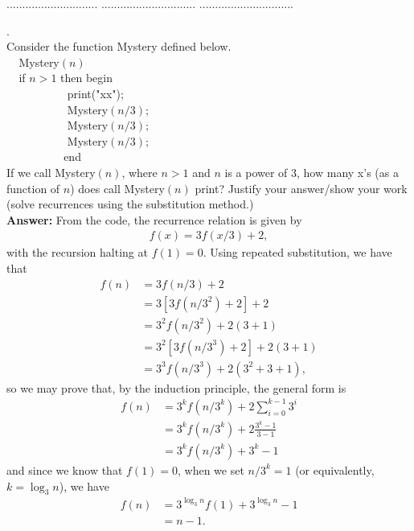 \documentclass[a4paper,11pt]{article}
\begin{document}
\pagebreak


 $.............................$
 $..............................$
          $..............................$\\

\bigskip

.\\
Consider the function Mystery defined below.\\
\noindent
$~~~~~$Mystery$(n)$\\
$~~~~~$if $n > 1$ then
 begin\\
$~~~~~~~~~~~~~~~~~~~~~~~$ print("xx");\\
$~~~~~~~~~~~~~~~~~~~~~~~$ Mystery$(n/3);$  \\
$~~~~~~~~~~~~~~~~~~~~~~~$ Mystery$(n/3); $ \\ 
$~~~~~~~~~~~~~~~~~~~~~~~$ Mystery$(n/3);$  \\
$~~~~~~~~~~~~~~~~~~~~~~~$end\\
If we call Mystery$(n)$, where $n>1$ and $n$ is a power of 3, how many x's (as a function of $n$)
does call Mystery$(n)$ print?
Justify your answer/show your work
(solve recurrences using the substitution method.)\\
{\bf Answer:}
From the code, the recurrence relation is given by
\begin{align*}
    f(x) = 3f(x/3) + 2,
\end{align*}
with the recursion halting at $f(1) = 0$. Using repeated substitution, we have that
\begin{align*}
    f(n) &= 3f(n/3) + 2 \\
    &= 3[3f(n/3^2) + 2] + 2 \\
    &= 3^2f(n/3^2) + 2(3 + 1) \\
    &= 3^2[3f(n/3^3) + 2] + 2(3 + 1) \\
    &= 3^3f(n/3^3) + 2(3^2 + 3 + 1),
\end{align*}
so we may prove that, by the induction principle, the general form is
\begin{align*}
    f(n) &= 3^kf(n/3^k) + 2\sum_{i = 0}^{k - 1} 3^i \\
    &= 3^kf(n/3^k) + 2\frac{3^k - 1}{3 - 1} \\
    &= 3^kf(n/3^k) + 3^k - 1
\end{align*}
and since we know that $f(1) = 0$, when we set $n/3^k = 1$ (or equivalently, $k = \log_3 n$), we have
\begin{align*}
    f(n) &= 3^{\log_3 n} f(1) + 3^{\log_3 n} - 1 \\
    &= n - 1.
\end{align*}
\end{document}
